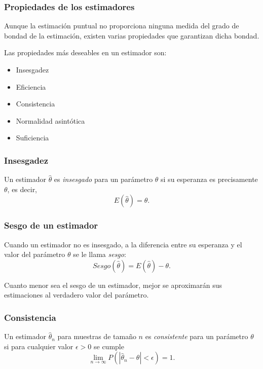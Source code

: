 \begin{frame}
\frametitle{Propiedades de los estimadores}
Aunque la estimación puntual no proporciona ninguna medida del grado de bondad de la estimación, existen varias propiedades que garantizan dicha bondad.

Las propiedades más deseables en un estimador son:
\begin{itemize}
\item Insesgadez
\item Eficiencia
\item Consistencia
\item Normalidad asintótica
\item Suficiencia
\end{itemize}
\end{frame}


\begin{frame}
\frametitle{Insesgadez}
\begin{definicion}
Un estimador $\hat \theta$ es \emph{insesgado} para un parámetro $\theta$ si su esperanza es precisamente $\theta$, es decir,
\[
E(\hat \theta)=\theta.
\]
\end{definicion}
\begin{center}
\scalebox{0.7}{}
\end{center}
\end{frame}


\begin{frame}
\frametitle{Sesgo de un estimador}
Cuando un estimador no es insesgado, a la diferencia entre su esperanza y el valor del parámetro $\theta$ se le llama \emph{sesgo}:
\[
Sesgo(\hat \theta) = E(\hat \theta)-\theta.
\]

Cuanto menor sea el sesgo de un estimador, mejor se aproximarán sus estimaciones al verdadero valor del parámetro.
\end{frame}


\begin{frame}
\frametitle{Consistencia}
\begin{definicion}
Un estimador $\hat \theta_n$ para muestras de tamaño $n$ es \emph{consistente} para un parámetro $\theta$ si para cualquier valor $\epsilon>0$ se cumple
\[
\lim_{n\rightarrow \infty} P(|\hat \theta_n-\theta|<\epsilon)=1.
\]
\end{definicion}
\begin{center}
\resizebox{0.49\textwidth}{!}{}
\resizebox{0.49\textwidth}{!}{}
\end{center}
\end{frame}


